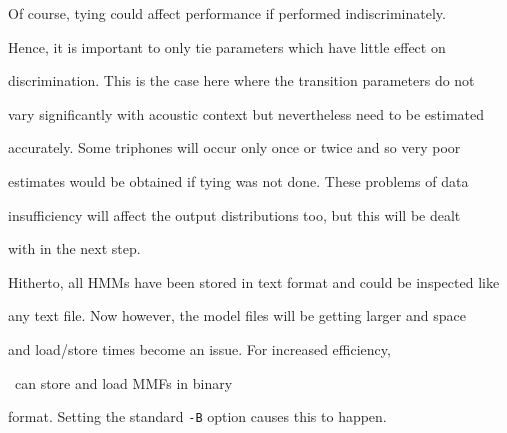 Of course, tying could affect performance if performed indiscriminately.


Hence, it is important to only tie parameters which have little effect on


discrimination.  This is the case here where the transition parameters do not


vary significantly with acoustic context but nevertheless need to be estimated


accurately.  Some triphones will occur only once or twice and so very poor


estimates would be obtained if tying was not done.  These problems of data


insufficiency will affect the output distributions too, but this will be dealt


with in the next step.





Hitherto, all HMMs have been stored in text format and could be inspected like


any text file.  Now however, the model files will be getting larger and space


and load/store times become an issue.  For increased efficiency,


\HTK\ can store and load MMFs in binary


format.  Setting the standard \texttt{-B} option causes this to happen.







